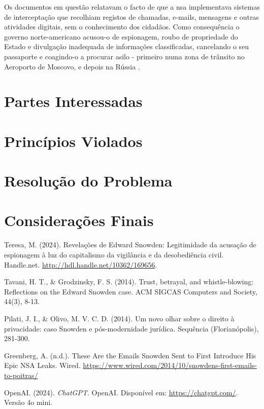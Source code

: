 \documentclass[a4paper,12pt]{article}
\begin{document}
Os documentos em questão relatavam o facto de que a \acrshort{nsa} implementava sistemas de interceptação que recolhiam registos de chamadas, e-mails, mensagens e outras atividades digitais, sem o conhecimento dos cidadãos. Como consequência o governo norte-americano acusou-o de espionagem, roubo de propriedade do Estado e divulgação inadequada de informações classificadas, cancelando o seu passaporte e coagindo-o a procurar asilo - primeiro numa zona de trânsito no Aeroporto de Moscovo, e depois na Rússia \cite{pilati}.


\section{Partes Interessadas}

\section{Princípios Violados}

\section{Resolução do Problema}

\section{Considerações Finais}

\begin{thebibliography}{10}

    Teresa, M. (2024). Revelações de Edward Snowden: Legitimidade da acusação de espionagem à luz do capitalismo da vigilância e da desobediência civil. Handle.net. \url{http://hdl.handle.net/10362/169656}.


        Tavani, H. T., \& Grodzinsky, F. S. (2014). Trust, betrayal, and whistle-blowing: Reflections on the Edward Snowden case. ACM SIGCAS Computers and Society, 44(3), 8-13.
    
    Pilati, J. I., \& Olivo, M. V. C. D. (2014). Um novo olhar sobre o direito à privacidade: caso Snowden e pós-modernidade jurídica. Sequência (Florianópolis), 281-300.
    
    Greenberg, A. (n.d.). These Are the Emails Snowden Sent to First Introduce His Epic NSA Leaks. Wired. \url{https://www.wired.com/2014/10/snowdens-first-emails-to-poitras/}


    
    
        OpenAI. (2024). \textit{ChatGPT}. OpenAI. Disponível em: \url{https://chatgpt.com/}. Versão 4o mini.
    
   
\end{thebibliography}

\printglossaries
\end{document}
